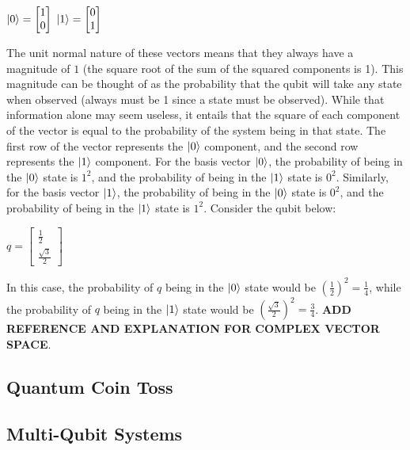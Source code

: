 \documentclass{article}
\begin{document}
\begin{center}
	$\ket{0} = \begin{bmatrix} 1 \\ 0 \end{bmatrix}$ \hspace{1cm} $\ket{1} = \begin{bmatrix} 0 \\ 1 \end{bmatrix}$	
\end{center}

The unit normal nature of these vectors means that they always have a magnitude of $1$ (the square root of the sum of the squared components is 1). This magnitude 
can be thought of as the probability that the qubit will take any state when observed (always must be 1 since a state must be observed). While that information alone may seem 
useless, it entails that the square of each component of the vector is equal to the probability of the system being in that state. The first row of the vector represents the 
$\ket{0}$ component, and the second row represents the $\ket{1}$ component. For the basis vector $\ket{0}$, the probability of being in the $\ket{0}$ state is $1^{2}$, and the 
probability of being in the $\ket{1}$ state is $0^{2}$. Similarly, for the basis vector $\ket{1}$, the probability of being in the $\ket{0}$ state is $0^{2}$, and the probability of 
being in the $\ket{1}$ state is $1^{2}$. Consider the qubit below:

\begin{center}
	$
	q =
	\begin{bmatrix}
		\frac{1}{2} \\
		\frac{\sqrt{3}}{2}
	\end{bmatrix}
	$
\end{center}

In this case, the probability of $q$ being in the $\ket{0}$ state would be $ (\frac{1}{2})^{2} = \frac{1}{4}$, while the probability of $q$ being in the $\ket{1}$ state would be 
$ (\frac{\sqrt{3}}{2})^{2} = \frac{3}{4}$.
\textbf{ADD REFERENCE AND EXPLANATION FOR COMPLEX VECTOR SPACE}. 


\subsection{Quantum Coin Toss}
\label{sec:quantumcointoss}
\subsection{Multi-Qubit Systems}
\label{sec:multiqubitsystems}
\end{document}
